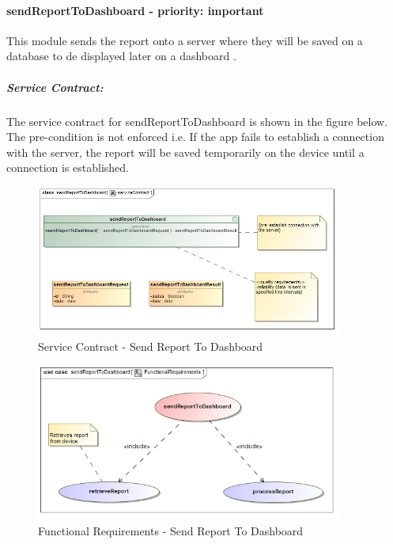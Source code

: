 \documentclass[hidelinks, 12pt, oneside]{article}
\begin{document}
								
		\paragraph{ sendReportToDashboard - priority: important}
		This module sends the report onto a server where they will be saved on a database to de displayed later on a dashboard .\newline
		\subparagraph{Service Contract:}
			The service contract for sendReportToDashboard is shown in the figure below. The pre-condition is not enforced i.e. If the app fails to establish a connection with the server, the report will be saved temporarily on the device until a connection is established.
			
		
		\begin{figure}[!htbp]
    		\centering
    		\includegraphics[width=0.9\textwidth]{img/serviceContractSendReportToDashboard.jpg}
    		\caption{Service Contract - Send Report To Dashboard}
    		\label{fig:ServiceCon_submitReport}
		\end{figure}
		\newpage	
			
		\begin{figure}[!htbp]
    		\centering
    		\includegraphics[width=0.9\textwidth]{img/functionalRequirementsSendReportToDashboard.jpg}
    		\caption{Functional Requirements - Send Report To Dashboard}
    		\label{fig:FunctionalReq_submitReport}
		\end{figure}
		
\end{document}

